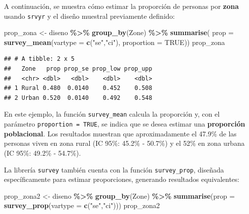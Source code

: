 \documentclass[
  spanish,
  12pt,
]{book}
\newenvironment{Shaded}{\begin{snugshade}}{\end{snugshade}}
\newcommand{\AttributeTok}[1]{\textcolor[rgb]{0.13,0.29,0.53}{#1}}
\newcommand{\ConstantTok}[1]{\textcolor[rgb]{0.56,0.35,0.01}{#1}}
\newcommand{\FunctionTok}[1]{\textcolor[rgb]{0.13,0.29,0.53}{\textbf{#1}}}
\newcommand{\NormalTok}[1]{#1}
\newcommand{\OtherTok}[1]{\textcolor[rgb]{0.56,0.35,0.01}{#1}}
\newcommand{\SpecialCharTok}[1]{\textcolor[rgb]{0.81,0.36,0.00}{\textbf{#1}}}
\newcommand{\StringTok}[1]{\textcolor[rgb]{0.31,0.60,0.02}{#1}}
\begin{document}
A continuación, se muestra cómo estimar la proporción de personas por \textbf{zona} usando \texttt{srvyr} y el diseño muestral previamente definido:

\begin{Shaded}
\begin{Highlighting}[]
\NormalTok{prop\_zona }\OtherTok{\textless{}{-}}\NormalTok{ diseno }\SpecialCharTok{\%\textgreater{}\%} \FunctionTok{group\_by}\NormalTok{(Zone) }\SpecialCharTok{\%\textgreater{}\%} 
             \FunctionTok{summarise}\NormalTok{(}
               \AttributeTok{prop =} \FunctionTok{survey\_mean}\NormalTok{(}\AttributeTok{vartype =} \FunctionTok{c}\NormalTok{(}\StringTok{"se"}\NormalTok{,}\StringTok{"ci"}\NormalTok{), }
                                  \AttributeTok{proportion =} \ConstantTok{TRUE}\NormalTok{))}
\NormalTok{prop\_zona}
\end{Highlighting}
\end{Shaded}

\begin{verbatim}
## # A tibble: 2 x 5
##   Zone   prop prop_se prop_low prop_upp
##   <chr> <dbl>   <dbl>    <dbl>    <dbl>
## 1 Rural 0.480  0.0140    0.452    0.508
## 2 Urban 0.520  0.0140    0.492    0.548
\end{verbatim}

En este ejemplo, la función \texttt{survey\_mean} calcula la proporción y, con el parámetro \texttt{proportion\ =\ TRUE}, se indica que se desea estimar una \textbf{proporción poblacional}. Los resultados muestran que aproximadamente el 47.9\% de las personas viven en zona rural (IC 95\%: 45.2\% - 50.7\%) y el 52\% en zona urbana (IC 95\%: 49.2\% - 54.7\%).

La librería \texttt{survey} también cuenta con la función \texttt{survey\_prop}, diseñada específicamente para estimar proporciones, generando resultados equivalentes:

\begin{Shaded}
\begin{Highlighting}[]
\NormalTok{prop\_zona2 }\OtherTok{\textless{}{-}}\NormalTok{ diseno }\SpecialCharTok{\%\textgreater{}\%} \FunctionTok{group\_by}\NormalTok{(Zone) }\SpecialCharTok{\%\textgreater{}\%} 
               \FunctionTok{summarise}\NormalTok{(}\AttributeTok{prop =} \FunctionTok{survey\_prop}\NormalTok{(}\AttributeTok{vartype =} \FunctionTok{c}\NormalTok{(}\StringTok{"se"}\NormalTok{,}\StringTok{"ci"}\NormalTok{)))}
\NormalTok{prop\_zona2}
\end{Highlighting}
\end{Shaded}
\end{document}
